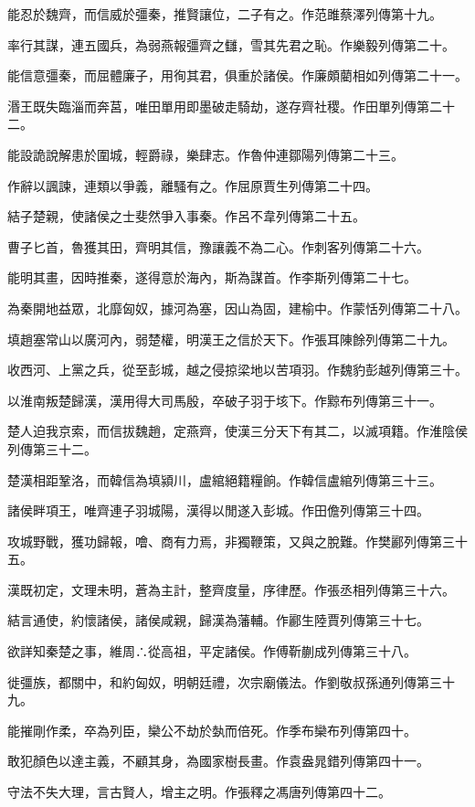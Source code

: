 能忍於魏齊，而信威於彊秦，推賢讓位，二子有之。作范雎蔡澤列傳第十九。

率行其謀，連五國兵，為弱燕報彊齊之讎，雪其先君之恥。作樂毅列傳第二十。

能信意彊秦，而屈體廉子，用徇其君，俱重於諸侯。作廉頗藺相如列傳第二十一。

湣王既失臨淄而奔莒，唯田單用即墨破走騎劫，遂存齊社稷。作田單列傳第二十二。

能設詭說解患於圍城，輕爵祿，樂肆志。作魯仲連鄒陽列傳第二十三。

作辭以諷諫，連類以爭義，離騷有之。作屈原賈生列傳第二十四。

結子楚親，使諸侯之士斐然爭入事秦。作呂不韋列傳第二十五。

曹子匕首，魯獲其田，齊明其信，豫讓義不為二心。作刺客列傳第二十六。

能明其畫，因時推秦，遂得意於海內，斯為謀首。作李斯列傳第二十七。

為秦開地益眾，北靡匈奴，據河為塞，因山為固，建榆中。作蒙恬列傳第二十八。

填趙塞常山以廣河內，弱楚權，明漢王之信於天下。作張耳陳餘列傳第二十九。

收西河、上黨之兵，從至彭城，越之侵掠梁地以苦項羽。作魏豹彭越列傳第三十。

以淮南叛楚歸漢，漢用得大司馬殷，卒破子羽于垓下。作黥布列傳第三十一。

楚人迫我京索，而信拔魏趙，定燕齊，使漢三分天下有其二，以滅項籍。作淮陰侯列傳第三十二。

楚漢相距鞏洛，而韓信為填潁川，盧綰絕籍糧餉。作韓信盧綰列傳第三十三。

諸侯畔項王，唯齊連子羽城陽，漢得以閒遂入彭城。作田儋列傳第三十四。

攻城野戰，獲功歸報，噲、商有力焉，非獨鞭策，又與之脫難。作樊酈列傳第三十五。

漢既初定，文理未明，蒼為主計，整齊度量，序律歷。作張丞相列傳第三十六。

結言通使，約懷諸侯，諸侯咸親，歸漢為藩輔。作酈生陸賈列傳第三十七。

欲詳知秦楚之事，維周∴從高祖，平定諸侯。作傅靳蒯成列傳第三十八。

徙彊族，都關中，和約匈奴，明朝廷禮，次宗廟儀法。作劉敬叔孫通列傳第三十九。

能摧剛作柔，卒為列臣，欒公不劫於埶而倍死。作季布欒布列傳第四十。

敢犯顏色以達主義，不顧其身，為國家樹長畫。作袁盎晁錯列傳第四十一。

守法不失大理，言古賢人，增主之明。作張釋之馮唐列傳第四十二。

